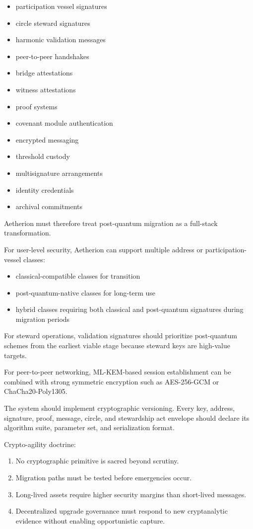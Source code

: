 ﻿\documentclass[12pt]{article}
\begin{document}
\begin{itemize}
  \item participation vessel signatures
  \item circle steward signatures
  \item harmonic validation messages
  \item peer-to-peer handshakes
  \item bridge attestations
  \item witness attestations
  \item proof systems
  \item covenant module authentication
  \item encrypted messaging
  \item threshold custody
  \item multisignature arrangements
  \item identity credentials
  \item archival commitments
\end{itemize}

Aetherion must therefore treat post-quantum migration as a full-stack transformation.

For user-level security, Aetherion can support multiple address or participation-vessel classes:

\begin{itemize}
  \item classical-compatible classes for transition
  \item post-quantum-native classes for long-term use
  \item hybrid classes requiring both classical and post-quantum signatures during migration periods
\end{itemize}

For steward operations, validation signatures should prioritize post-quantum schemes from the earliest viable stage because steward keys are high-value targets.

For peer-to-peer networking, ML-KEM-based session establishment can be combined with strong symmetric encryption such as AES-256-GCM or ChaCha20-Poly1305.

The system should implement cryptographic versioning. Every key, address, signature, proof, message, circle, and stewardship act envelope should declare its algorithm suite, parameter set, and serialization format.

Crypto-agility doctrine:

\begin{enumerate}
  \item No cryptographic primitive is sacred beyond scrutiny.
  \item Migration paths must be tested before emergencies occur.
  \item Long-lived assets require higher security margins than short-lived messages.
  \item Decentralized upgrade governance must respond to new cryptanalytic evidence without enabling opportunistic capture.
\end{enumerate}
\end{document}
